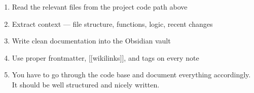 \documentclass[
]{article}
\providecommand{\tightlist}{%
  \setlength{\itemsep}{0pt}\setlength{\parskip}{0pt}}
\begin{document}
\begin{enumerate}
\def\labelenumi{\arabic{enumi}.}
\tightlist
\item
  Read the relevant files from the project code path above
\item
  Extract context --- file structure, functions, logic, recent changes
\item
  Write clean documentation into the Obsidian vault
\item
  Use proper frontmatter, {[}{[}wikilinks{]}{]}, and tags on every note
\item
  You have to go through the code base and document everything
  accordingly. It should be well structured and nicely written.
\end{enumerate}
\end{document}
